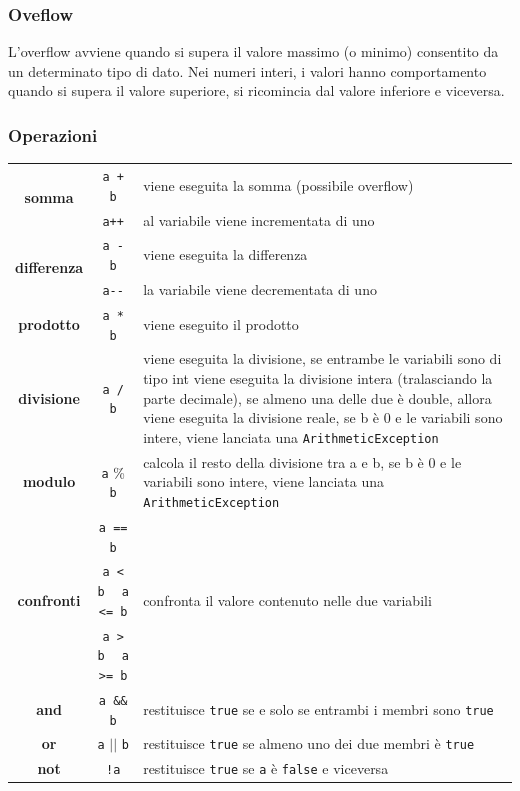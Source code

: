 \documentclass{article}
\begin{document}
\subsubsection*{Oveflow}
L'overflow avviene quando si supera il valore massimo (o minimo) consentito da un determinato tipo di dato. Nei numeri
interi, i valori hanno comportamento  quando si supera il valore superiore, si ricomincia dal valore inferiore 
e viceversa.

\subsubsection*{Operazioni}
\begin{center}
	\begin{tabularx}{\textwidth}{c c X}		
		\multirow{2}{*}{\textbf{somma}}
		& \verb|a + b| & viene eseguita la somma (possibile overflow) \\
		& \verb|a++| & al variabile viene incrementata di uno \\
		\midrule

		\multirow{2}{*}{\textbf{differenza}}
		& \verb|a - b| & viene eseguita la differenza \\
		& \verb|a--| & la variabile viene decrementata di uno \\
		\midrule
		
		\textbf{prodotto}
		& \verb|a * b| & viene eseguito il prodotto \\
		\midrule
		
		\textbf{divisione}
		& \verb|a / b| & viene eseguita la divisione, se entrambe le variabili sono di tipo int viene eseguita la divisione
		intera (tralasciando la parte decimale), se almeno una delle due è double, allora viene eseguita la divisione reale,
		se b è 0 e le variabili sono intere, viene lanciata una \verb|ArithmeticException| \\
		\midrule
		
		\textbf{modulo}
		& \verb|a| \% \verb|b| & calcola il resto della divisione tra a e b, se b è 0 e le variabili sono intere, viene
		lanciata una \verb|ArithmeticException| \\
		\midrule
		
		\multirow{3}{*}{\textbf{confronti}}
		& \verb|a == b| & \multirow{3}{*}{confronta il valore contenuto nelle due variabili} \\
		& \verb|a < b| \(\;\;\) \verb|a <= b| & \\
		& \verb|a > b| \(\;\;\) \verb|a >= b| & \\
		\midrule

		\textbf{and}
		& \verb|a && b| & restituisce \verb|true| se e solo se entrambi i membri sono \verb|true| \\
		\midrule

		\textbf{or}
		& \verb|a| \(||\) \verb|b| & restituisce \verb|true| se almeno uno dei due membri è \verb|true| \\
		\midrule

		\textbf{not}
		& \verb|!a| & restituisce \verb|true| se \verb|a| è \verb|false| e viceversa
	\end{tabularx}
\end{center}
\end{document}
